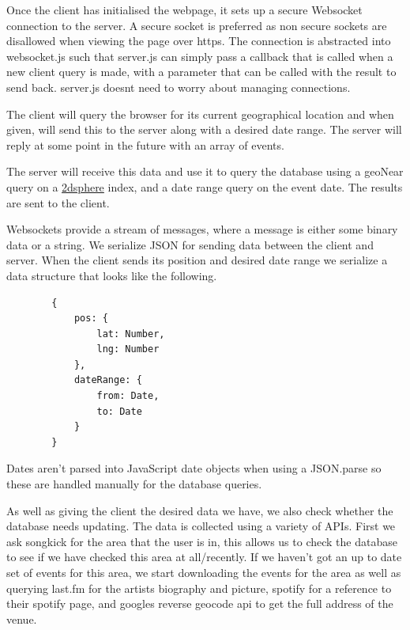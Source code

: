 \documentclass[10pt]{article}
\begin{document}
        Once the client has initialised the webpage, it sets up a secure Websocket connection to the server. A secure socket is preferred as non secure sockets are disallowed when viewing the page over https. The connection is abstracted into websocket.js such that server.js can simply pass a callback that is called when a new client query is made, with a parameter that can be called with the result to send back. server.js doesnt need to worry about managing connections.

        The client will query the browser for its current geographical location and when given, will send this to the server along with a desired date range. The server will reply at some point in the future with an array of events.

        The server will receive this data and use it to query the database using a geoNear query on a \href{https://docs.mongodb.com/manual/core/2dsphere/}{2dsphere} index, and a date range query on the event date. The results are sent to the client.

        Websockets provide a stream of messages, where a message is either some binary data or a string. We serialize JSON for sending data between the client and server. When the client sends its position and desired date range we serialize a data structure that looks like the following.

        \begin{verbatim}
        {
            pos: {
                lat: Number,
                lng: Number
            },
            dateRange: {
                from: Date,
                to: Date
            }
        }
        \end{verbatim}

        Dates aren't parsed into JavaScript date objects when using a JSON.parse so these are handled manually for the database queries.

        As well as giving the client the desired data we have, we also check whether the database needs updating. The data is collected using a variety of APIs. First we ask songkick for the area that the user is in, this allows us to check the database to see if we have checked this area at all/recently. If we haven't got an up to date set of events for this area, we start downloading the events for the area as well as querying last.fm for the artists biography and picture, spotify for a reference to their spotify page, and googles reverse geocode api to get the full address of the venue.
\end{document}
